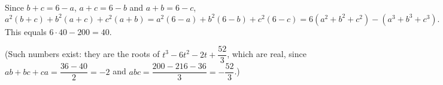 Since $b+c=6-a$, $a+c=6-b$ and $a+b=6-c$,
\[
a^2(b+c)+b^2(a+c)+c^2(a+b)=a^2(6-a)+b^2(6-b)+c^2(6-c)=6(a^2+b^2+c^2)-(a^3+b^3+c^3).
\]
This equals $6\cdot40-200=\boxed{40}$.

(Such numbers exist: they are the roots of $t^3-6t^2-2t+\dfrac{52}{3}$, which are real, since $ab+bc+ca=\dfrac{36-40}{2}=-2$ and $abc=\dfrac{200-216-36}{3}=-\dfrac{52}{3}$.)
